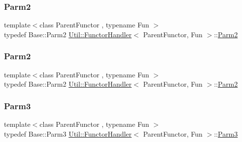 \subsubsection{\texorpdfstring{Parm2}{Parm2}\hspace{0.1cm}{\footnotesize\ttfamily [1/2]}}
{\footnotesize\ttfamily template$<$class Parent\+Functor , typename Fun $>$ \\
typedef Base\+::\+Parm2 \mbox{\hyperlink{classUtil_1_1FunctorHandler}{Util\+::\+Functor\+Handler}}$<$ Parent\+Functor, Fun $>$\+::\mbox{\hyperlink{classUtil_1_1FunctorHandler_a5fb5374c316f8ac252aa22fcdf7d21a7}{Parm2}}}

\mbox{\label{classUtil_1_1FunctorHandler_a5fb5374c316f8ac252aa22fcdf7d21a7}} 
\subsubsection{\texorpdfstring{Parm2}{Parm2}\hspace{0.1cm}{\footnotesize\ttfamily [2/2]}}
{\footnotesize\ttfamily template$<$class Parent\+Functor , typename Fun $>$ \\
typedef Base\+::\+Parm2 \mbox{\hyperlink{classUtil_1_1FunctorHandler}{Util\+::\+Functor\+Handler}}$<$ Parent\+Functor, Fun $>$\+::\mbox{\hyperlink{classUtil_1_1FunctorHandler_a5fb5374c316f8ac252aa22fcdf7d21a7}{Parm2}}}

\mbox{\label{classUtil_1_1FunctorHandler_a25f1b9dd7890c1dbc68abc686f30bec8}} 
\subsubsection{\texorpdfstring{Parm3}{Parm3}\hspace{0.1cm}{\footnotesize\ttfamily [1/2]}}
{\footnotesize\ttfamily template$<$class Parent\+Functor , typename Fun $>$ \\
typedef Base\+::\+Parm3 \mbox{\hyperlink{classUtil_1_1FunctorHandler}{Util\+::\+Functor\+Handler}}$<$ Parent\+Functor, Fun $>$\+::\mbox{\hyperlink{classUtil_1_1FunctorHandler_a25f1b9dd7890c1dbc68abc686f30bec8}{Parm3}}}

